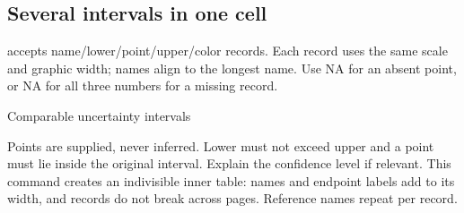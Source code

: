 \subsection{Several intervals in one cell}
 accepts name/lower/point/upper/color records.
Each record uses the same scale and graphic width; names align to the longest name.
Use NA for an absent point, or NA for all three numbers for a missing record.
\begin{demo}{Comparable uncertainty intervals}
\end{demo}
Points are supplied, never inferred. Lower must not exceed upper and a point
must lie inside the original interval. Explain the confidence level if relevant.
This command creates an indivisible inner table: names and endpoint labels add
to its width, and records do not break across pages. Reference names repeat per record.
